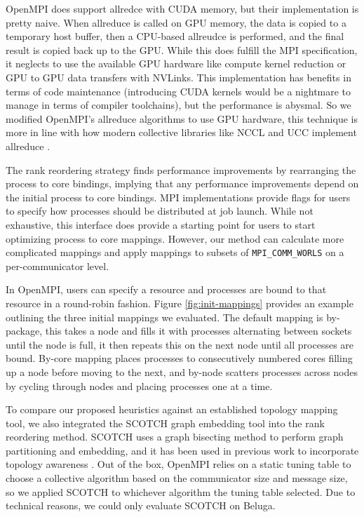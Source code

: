 OpenMPI does support allredce with \gls{CUDA} memory, but their implementation is pretty naive.
When allreduce is called on \gls{GPU} memory, the data is copied to a temporary host buffer, then a \gls{CPU}-based allreudce is performed, and the final result is copied back up to the \gls{GPU}.
While this does fulfill the \gls{MPI} specification, it neglects to use the available \gls{GPU} hardware like compute kernel reduction or \gls{GPU} to \gls{GPU} data transfers with NVLinks.
This implementation has benefits in terms of code maintenance (introducing \gls{CUDA} kernels would be a nightmare to manage in terms of compiler toolchains), but the performance is abysmal. 
So we modified OpenMPI's allreduce algorithms to use \gls{GPU} hardware, this technique is more in line with how modern collective libraries like \gls{NCCL} and \gls{UCC} implement allreduce \cite{UCC, NCCL}.

The rank reordering strategy finds performance improvements by rearranging the process to core bindings, implying that any performance improvements depend on the initial process to core bindings.
\gls{MPI} implementations provide flags for users to specify how processes should be distributed at job launch. 
While not exhaustive, this interface does provide a starting point for users to start optimizing process to core mappings.
However, our method can calculate more complicated mappings and apply mappings to subsets of \texttt{MPI\_COMM\_WORLS} on a per-communicator level.

In OpenMPI, users can specify a resource and processes are bound to that resource in a round-robin fashion.
Figure \ref{fig:init-mappings} provides an example outlining the three initial mappings we evaluated.
The default mapping is by-package, this takes a node and fills it with processes alternating between sockets until the node is full, it then repeats this on the next node until all processes are bound.
By-core mapping places processes to consecutively numbered cores filling up a node before moving to the next, and by-node scatters processes across nodes by cycling through nodes and placing processes one at a time.



To compare our proposed heuristics against an established topology mapping tool, we also integrated the SCOTCH graph embedding tool \cite{Pellegrini2012SCOTCH} into the rank reordering method.
SCOTCH uses a graph bisecting method to perform graph partitioning and embedding, and it has been used in previous work to incorporate topology awareness \cite{Mirsadeghi2016TopoAwareCollRR, Bordage2018Netloc, Deveci2015FastHQTopoAwareTaskMapping}.
Out of the box, OpenMPI relies on a static tuning table to choose a collective algorithm based on the communicator size and message size, so we applied SCOTCH to whichever algorithm the tuning table selected.
Due to technical reasons, we could only evaluate SCOTCH on Beluga.


